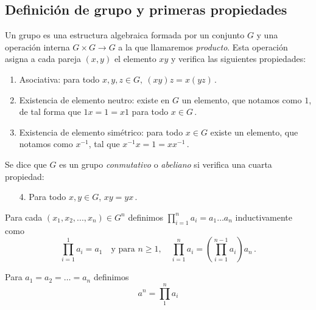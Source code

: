 \subsection{Definición de grupo y primeras propiedades}

\begin{ndef}[Grupo]
Un grupo es una estructura algebraica formada por un conjunto $G$ y una operación interna 
$G \times G \to G$ a la que llamaremos \textit{producto}. Esta operación asigna a cada pareja $(x,y)$ el elemento $xy$ y verifica las siguientes propiedades:
\begin{enumerate}
  \item Asociativa: para todo $x,y,z \in G, \ (xy)z = x(yz)\,.$
  \item Existencia de elemento neutro: existe en $G$ un elemento, que notamos como $1$, de tal forma que  $1x = 1 = x1$ para todo $x \in G$\,.
  \item Existencia de elemento simétrico: para todo $x \in G$ existe un elemento, que notamos como $x^{-1}$, tal que $x^{-1}x = 1 = xx^{-1}$\,.
\end{enumerate}
Se dice que $G$ es un grupo \textit{conmutativo} o \textit{abeliano} si verifica una cuarta propiedad: \begin{enumerate}
  \item[4.] Para todo $x, y \in G$, $xy = yx$\,.
\end{enumerate}

\end{ndef}

\begin{nota}[Notación]
  Para cada $(x_1,x_2,...,x_n) \in G^{n}$ definimos $\prod_{i=1}^{n} a_i = a_1\hdots a_n$ inductivamente como \begin{equation*}
    \prod_{i=1}^{1} a_i = a_1 \quad \text{y para } n \geq 1, \quad \prod_{i=1}^{n} a_i = \left(\prod_{i=1}^{n-1} a_i\right)a_n\,.
  \end{equation*}
\end{nota}

\begin{nota}[Notación]
  Para $a_1 = a_2 = \hdots = a_n$ definimos \begin{equation*}
    a^n = \prod_{1}^{n} a_i
  \end{equation*}
\end{nota}

